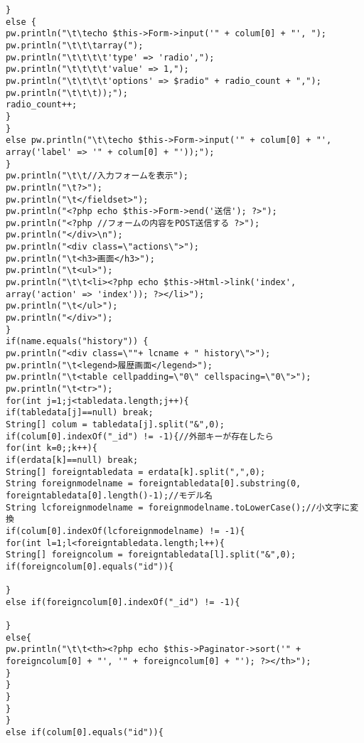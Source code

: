 \documentclass{funthesis}
\begin{document}
\begin{lstlisting}[caption=WriteView.java,label=1]
}
else {
pw.println("\t\techo $this->Form->input('" + colum[0] + "', ");
pw.println("\t\t\tarray(");
pw.println("\t\t\t\t'type' => 'radio',");
pw.println("\t\t\t\t'value' => 1,");
pw.println("\t\t\t\t'options' => $radio" + radio_count + ",");
pw.println("\t\t\t));");
radio_count++;
}
}
else pw.println("\t\techo $this->Form->input('" + colum[0] + "', array('label' => '" + colum[0] + "'));");
}
pw.println("\t\t//入力フォームを表示");
pw.println("\t?>");
pw.println("\t</fieldset>");
pw.println("<?php echo $this->Form->end('送信'); ?>");
pw.println("<?php //フォームの内容をPOST送信する ?>");
pw.println("</div>\n");
pw.println("<div class=\"actions\">");
pw.println("\t<h3>画面</h3>");
pw.println("\t<ul>");
pw.println("\t\t<li><?php echo $this->Html->link('index', array('action' => 'index')); ?></li>");
pw.println("\t</ul>");
pw.println("</div>");
}
if(name.equals("history")) {
pw.println("<div class=\""+ lcname + " history\">");
pw.println("\t<legend>履歴画面</legend>");
pw.println("\t<table cellpadding=\"0\" cellspacing=\"0\">");
pw.println("\t<tr>");
for(int j=1;j<tabledata.length;j++){
if(tabledata[j]==null) break;
String[] colum = tabledata[j].split("&",0);
if(colum[0].indexOf("_id") != -1){//外部キーが存在したら
for(int k=0;;k++){
if(erdata[k]==null) break;
String[] foreigntabledata = erdata[k].split(",",0);
String foreignmodelname = foreigntabledata[0].substring(0, foreigntabledata[0].length()-1);//モデル名
String lcforeignmodelname = foreignmodelname.toLowerCase();//小文字に変換
if(colum[0].indexOf(lcforeignmodelname) != -1){
for(int l=1;l<foreigntabledata.length;l++){
String[] foreigncolum = foreigntabledata[l].split("&",0);
if(foreigncolum[0].equals("id")){

}
else if(foreigncolum[0].indexOf("_id") != -1){

}
else{
pw.println("\t\t<th><?php echo $this->Paginator->sort('" + foreigncolum[0] + "', '" + foreigncolum[0] + "'); ?></th>");
}
}
}
}
}
else if(colum[0].equals("id")){


\end{lstlisting}
\end{document}
